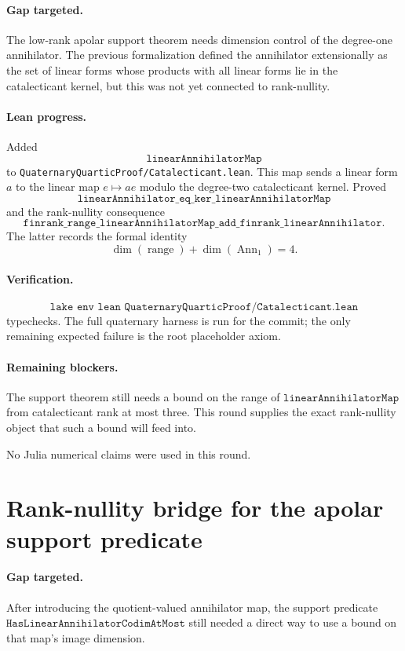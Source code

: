 \documentclass[11pt]{article}
\begin{document}
\paragraph{Gap targeted.}
The low-rank apolar support theorem needs dimension control of the degree-one
annihilator.  The previous formalization defined the annihilator extensionally
as the set of linear forms whose products with all linear forms lie in the
catalecticant kernel, but this was not yet connected to rank-nullity.

\paragraph{Lean progress.}
Added
\[
\texttt{linearAnnihilatorMap}
\]
to \texttt{QuaternaryQuarticProof/Catalecticant.lean}.  This map sends a
linear form \(a\) to the linear map \(e\mapsto ae\) modulo the degree-two
catalecticant kernel.  Proved
\[
\texttt{linearAnnihilator\_eq\_ker\_linearAnnihilatorMap}
\]
and the rank-nullity consequence
\[
\texttt{finrank\_range\_linearAnnihilatorMap\_add\_finrank\_linearAnnihilator}.
\]
The latter records the formal identity
\[
\dim(\operatorname{range})+\dim(\operatorname{Ann}_1)=4.
\]

\paragraph{Verification.}
\[
\texttt{lake env lean QuaternaryQuarticProof/Catalecticant.lean}
\]
typechecks.  The full quaternary harness is run for the commit; the only
remaining expected failure is the root placeholder axiom.

\paragraph{Remaining blockers.}
The support theorem still needs a bound on the range of
\(\texttt{linearAnnihilatorMap}\) from catalecticant rank at most three.  This
round supplies the exact rank-nullity object that such a bound will feed into.

No Julia numerical claims were used in this round.

\section*{Rank-nullity bridge for the apolar support predicate}

\paragraph{Gap targeted.}
After introducing the quotient-valued annihilator map, the support predicate
\(\texttt{HasLinearAnnihilatorCodimAtMost}\) still needed a direct way to use
a bound on that map's image dimension.
\end{document}
